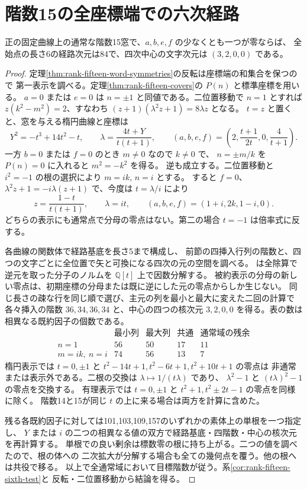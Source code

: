 \section{階数15の全座標端での六次経路}
\label{sec:rank-fifteen-coordinate-ends}
\begin{theorem}\label{thm:rank-fifteen-coordinate-ends}
正の固定曲線上の通常な階数15窓で、$a,b,e,f$ の少なくとも一つが零ならば、
全始点の長さ6の経路次元は84で、四次中心の文字次元は $(3,2,0,0)$ である。
\end{theorem}
\begin{proof}
定理\ref{thm:rank-fifteen-word-symmetries}の反転は座標端の和集合を保つので
第一表示を調べる。定理\ref{thm:rank-fifteen-covers}の $P(n)$ と標準座標を用いる。
$a=0$ または $e=0$ は $n=\pm1$ と同値である。二位置移動で $n=1$ とすれば
$z(k^2-m^2)=2$、すなわち $(z+1)(\lambda^2z+1)=8\lambda z$ となる。
$t=z$ と置くと、窓を与える楕円曲線と座標は
\[
 Y^2=-t^3+14t^2-t,\qquad \lambda=\frac{4t+Y}{t(t+1)},\qquad
 (a,b,e,f)=\left(2,\frac{t+1}{2t},0,\frac4{t+1}\right).
\]
一方 $b=0$ または $f=0$ のとき $m\ne0$ なので $k\ne0$ で、
$n=\pm m/k$ を $P(n)=0$ に入れると $m^2=-k^2$ を得る。
逆も成立する。二位置移動と $i^2=-1$ の根の選択により $m=ik$, $n=i$ とする。
すると $f=0$、$\lambda^2z+1=-i\lambda(z+1)$ で、今度は $t=\lambda/i$ により
\[
 z=\frac{1-t}{t(t+1)},\qquad \lambda=it,\qquad
 (a,b,e,f)=(1+i,2k,1-i,0).
\]
どちらの表示にも通常点で分母の零点はない。第二の場合 $t=-1$ は倍率式に反する。

各曲線の関数体で経路基底を長さ5まで構成し、
前節の四挿入行列の階数と、四つの文字ごとに全位置で矢と可換になる四次の元の空間を調べる。
は全除算で逆元を取った分子のノルムを $\mathbb Q[t]$ 上で因数分解する。
被約表示の分母の新しい零点は、初期座標の分母または既に逆にした元の零点からしか生じない。
同じ長さの疎な行を同じ順で選び、主元の列を最小と最大に変えた二回の計算で
各々挿入の階数 $36,34,36,34$ と、中心の四つの核次元 $3,2,0,0$ を得る。表の数は相異なる既約因子の個数である。
\[
\begin{array}{c|rr|r|r}
 &\text{最小列}&\text{最大列}&\text{共通}&\text{通常域の残余}\\\hline
 n=1 &56&50&17&11\\
 m=ik,\ n=i &74&56&13&7
\end{array}
\]
楕円表示では $t=0,\pm1$ と $t^2-14t+1,t^2-6t+1,t^2+10t+1$ の零点は
非通常または表示外である。二根の交換は $\lambda\mapsto1/(t\lambda)$ であり、
$\lambda^2-1$ と $(t\lambda)^2-1$ の零点を交換する。
有理表示では $t=0,\pm1$ と $t^2+1,t^2\pm2t-1$ の零点を同様に除く。
階数14と15が同じ $t$ の上に来る場合は両方を計算に含めた。

残る各既約因子に対しては101,103,109,157のいずれかの素体上の単根を一つ指定し、
$Y$ または $i$ の二つの相異なる値の双方で経路基底・四階数・中心の核次元を再計算する。
単根での良い剰余は標数零の根に持ち上がる。二つの値を調べたので、根の体への
二次拡大が分解する場合も全ての幾何点を覆う。他の根へは共役で移る。
以上で全通常域において目標階数が従う。系\ref{cor:rank-fifteen-sixth-test}と
反転・二位置移動から結論を得る。
\end{proof}
